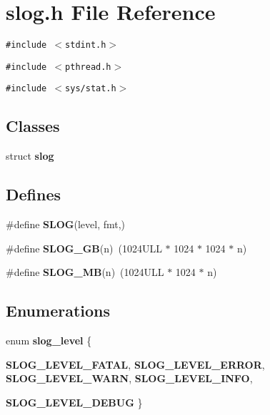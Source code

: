 \section{slog.h File Reference}
\label{slog_8h}
{\tt \#include $<$stdint.h$>$}\par
{\tt \#include $<$pthread.h$>$}\par
{\tt \#include $<$sys/stat.h$>$}\par
\subsection*{Classes}
\begin{CompactItemize}
\item 
struct {\bf slog}
\end{CompactItemize}
\subsection*{Defines}
\begin{CompactItemize}
\item 
\#define {\bf SLOG}(level, fmt,)
\item 
\#define {\bf SLOG\_\-GB}(n)\ (1024ULL $\ast$ 1024 $\ast$ 1024 $\ast$ n)\label{slog_8h_a1}

\item 
\#define {\bf SLOG\_\-MB}(n)\ (1024ULL $\ast$ 1024 $\ast$ n)\label{slog_8h_a2}

\end{CompactItemize}
\subsection*{Enumerations}
\begin{CompactItemize}
\item 
enum {\bf slog\_\-level} \{ \par
{\bf SLOG\_\-LEVEL\_\-FATAL}, 
{\bf SLOG\_\-LEVEL\_\-ERROR}, 
{\bf SLOG\_\-LEVEL\_\-WARN}, 
{\bf SLOG\_\-LEVEL\_\-INFO}, 
\par
{\bf SLOG\_\-LEVEL\_\-DEBUG}
 \}
\end{CompactItemize}
